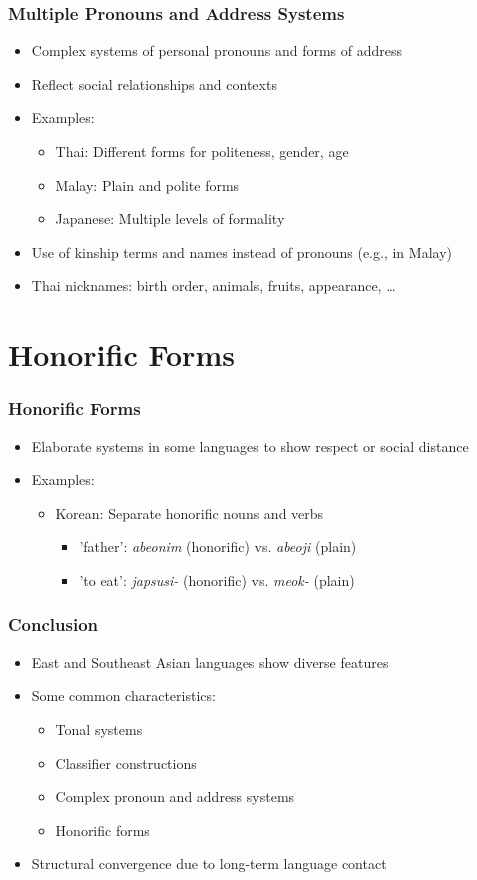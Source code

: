 \documentclass{beamer}
\begin{document}
\begin{frame}
\frametitle{Multiple Pronouns and Address Systems}
\begin{itemize}
\item Complex systems of personal pronouns and forms of address
\item Reflect social relationships and contexts
\item Examples:
  \begin{itemize}
  \item Thai: Different forms for politeness, gender, age
  \item Malay: Plain and polite forms
  \item Japanese: Multiple levels of formality
  \end{itemize}
\item Use of kinship terms and names instead of pronouns (e.g., in Malay)
\item Thai nicknames: birth order, animals, fruits, appearance, \ldots
\end{itemize}
\end{frame}

\section{Honorific Forms}

\begin{frame}
\frametitle{Honorific Forms}
\begin{itemize}
\item Elaborate systems in some languages to show respect or social distance
\item Examples:
  \begin{itemize}
  \item Korean: Separate honorific nouns and verbs
    \begin{itemize}
    \item 'father': \emph{abeonim} (honorific) vs. \emph{abeoji} (plain)
    \item 'to eat': \emph{japsusi-} (honorific) vs. \emph{meok-} (plain)
    \end{itemize} 
  \end{itemize}
\end{itemize}
\end{frame}

\begin{frame}
\frametitle{Conclusion}
\begin{itemize}
\item East and Southeast Asian languages show diverse features
\item Some common characteristics:
  \begin{itemize}
  \item Tonal systems
  \item Classifier constructions
  \item Complex pronoun and address systems
  \item Honorific forms
  \end{itemize}
\item Structural convergence due to long-term language contact
\end{itemize}
\end{frame}
\end{document}
